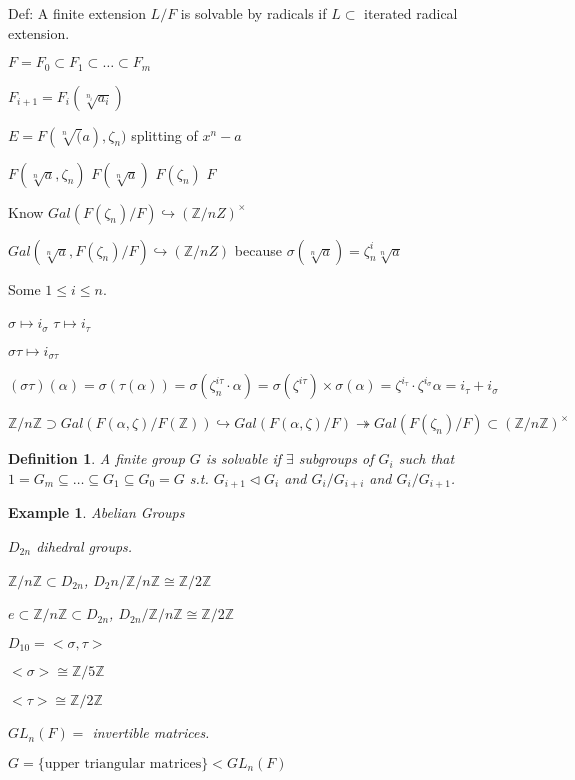 \documentclass[twoside]{article}
\newcommand{\Z}{\mathbb{Z}}
\newcommand{\z}{\zeta}
\newcommand{\al}{\alpha}
\newcommand{\hra}{\hookrightarrow}
\newtheorem{definition}[theorem]{Definition}
\newtheorem{example}[theorem]{Example}
\begin{document}
Def: A finite extension $L/F$ is solvable by radicals if $L \subset $ iterated radical extension. 


$F  = F_0 \subset F_1 \subset \dots \subset F_m$

$F_{i+1} = F_i(\sqrt[n_i]{a_i})$

$E = F(\sqrt[n](a), \z_n)$ splitting of $x^n -a$

                $F(\sqrt[n]{a}, \z_n)$
$F(\sqrt[n]{a})$                      $F(\z_n)$
                        $F$ 

Know $Gal(F(\z_n)/F) \hookrightarrow (\Z/nZ)^\times$


$Gal(\sqrt[n]{a}, F(\z_n)/F) \hookrightarrow (\Z/nZ)$
because $\sigma(\sqrt[n]a) = \z_n^i \sqrt[n]a$


Some $1 \leq i \leq n$. 

$\sigma \mapsto i_\sigma$
$\tau \mapsto i_\tau$

$\sigma\tau \mapsto i_{\sigma\tau}$

$(\sigma\tau)(\al) = \sigma(\tau(\alpha)) = \sigma(\z_n^{i\tau}\cdot\alpha) = \sigma(\z^{i\tau})\times\sigma(\alpha) = \zeta^{i_\tau}\cdot \zeta^{i_\sigma}\alpha = i_\tau + i_\sigma$

$\Z/n\Z \supset Gal(F(\alpha, \z)/F(\Z)) \hra Gal(F(\alpha,\zeta)/F) \twoheadrightarrow Gal(F(\z_n)/F) \subset (\Z/n\Z)^\times$

\begin{definition}
    A finite group $G$ is solvable if $\exists$ subgroups of $G_i$ such that ${1} = G_m \subseteq \dots \subseteq G_1 \subseteq G_0 = G$
    s.t. $G_{i+1} \triangleleft G_i$ and $G_i/G_{i+i}$ and $G_i/G_{i+1}$. 
\end{definition}


\begin{example}
    Abelian Groups

    $D_{2n}$ dihedral groups. 
    
    $\Z/n\Z \subset D_{2n}$, $D_2n/\Z/n\Z \cong \Z/2\Z$        

    ${e} \subset \Z/n\Z \subset D_{2n}$, $D_{2n}/\Z/n\Z \cong \Z/2\Z$

    $D_{10} = <\sigma, \tau>$

    $<\sigma> \cong \Z/5\Z$

    $<\tau> \cong \Z/2\Z$

    $GL_n(F) = $ invertible matrices.

    $G = \{\text{upper triangular matrices}\} <  GL_n(F)$

\end{example}
\end{document}
